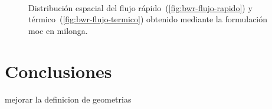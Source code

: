 \documentclass[11pt]{article}
\numberwithin{equation}{section}
\begin{document}
\begin{figure}[!h]
 \begin{center}
  \\
  \caption{Distribución espacial del flujo rápido~(\ref{fig:bwr-flujo-rapido}) y térmico~(\ref{fig:bwr-flujo-termico}) obtenido mediante la formulación moc en milonga.}
  \label{fig:bwr-flujos}
 \end{center}
\end{figure}



\section{Conclusiones}

mejorar la definicion de geometrias

\label{lastpage}


\pagebreak
\printbibliography
\end{document}

